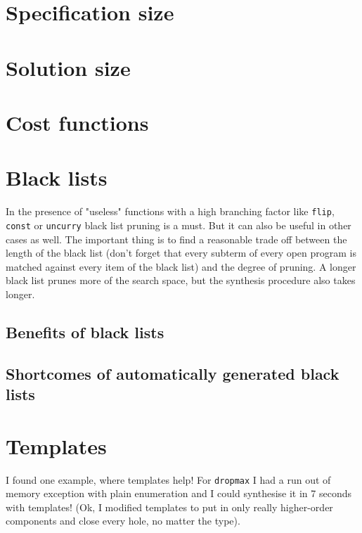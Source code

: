 \section{Specification size}

\section{Solution size}
  
\section{Cost functions}

\section{Black lists}

In the presence of "useless" functions with a high branching factor like \lstinline?flip?, \lstinline?const? or \lstinline?uncurry? black list pruning is a must. But it can also be useful in other cases as well. The important thing is to find a reasonable trade off between the length of the black list (don't forget that every subterm of every open program is matched against every item of the black list) and the degree of pruning. A longer black list prunes more of the search space, but the synthesis procedure also takes longer.

  \subsection{Benefits of black lists}
  \subsection{Shortcomes of automatically generated black lists}

\section{Templates}
I found one example, where templates help! For \lstinline?dropmax? I had a run out of memory exception with plain enumeration and I could synthesise it in 7 seconds with templates!
(Ok, I modified templates to put in only really higher-order components and close every hole, no matter the type).

